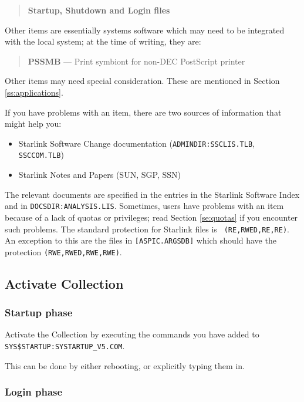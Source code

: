 \begin{quote}
{\bf Startup, Shutdown and Login files}
\end{quote}

Other items are essentially systems software which may need to be integrated
with the local system; at the time of writing, they are:

\begin{quote} 
{\bf PSSMB} --- Print symbiont for non-DEC PostScript printer
\end{quote}

Other items may need special consideration. These are mentioned in Section
\ref{ss:applications}.

If you have problems with an item, there are two sources of information that
might help you:

\begin{itemize}
\item Starlink Software Change documentation ({\tt ADMINDIR:SSCLIS.TLB},
{\tt SSCCOM.TLB})
\item Starlink Notes and Papers (SUN, SGP, SSN)
\end{itemize}

The relevant documents are specified in the entries in the Starlink Software
Index and in {\tt DOCSDIR:ANALYSIS.LIS}. Sometimes, users have problems with an
item because of a lack of quotas or privileges; read Section \ref{se:quotas} if
you encounter such problems. The standard protection for Starlink files is {\tt
(RE,RWED,RE,RE)}. An exception to this are the files in {\tt [ASPIC.ARGSDB]}
which should have the protection {\tt (RWE,RWED,RWE,RWE)}.

\subsection {Activate Collection}
\label{ss:activate}

\subsubsection {Startup phase}
\label{subss:startup}

Activate the Collection by executing the commands you have added to
{\tt SYS\$STARTUP:\-SYSTART\-UP\_V5.\-COM}.

This can be done by either rebooting, or explicitly typing them in.

\subsubsection {Login phase}
\label{subss:login}

